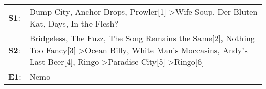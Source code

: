 \begin{supertabular}{p{0.03\textwidth}p{0.92\textwidth}}
 \textbf{S1}:  &                                                                                                                                                                                         Dump City\textsuperscript{}, \enspace Anchor Drops\textsuperscript{}, \enspace Prowler[1]\textsuperscript{} \textgreater \enspace Wife Soup\textsuperscript{}, \enspace Der Bluten Kat\textsuperscript{},  Days\textsuperscript{}, \enspace In the Flesh?\textsuperscript{}  \enspace  \\
 \textbf{S2}:  &  Bridgeless\textsuperscript{}, \enspace The Fuzz\textsuperscript{}, \enspace The Song Remains the Same[2]\textsuperscript{}, \enspace Nothing Too Fancy[3]\textsuperscript{} \textgreater \enspace Ocean Billy\textsuperscript{}, \enspace White Man's Moccasins\textsuperscript{}, \enspace Andy's Last Beer[4]\textsuperscript{}, \enspace Ringo\textsuperscript{} \textgreater \enspace Paradise City[5]\textsuperscript{} \textgreater \enspace Ringo[6]\textsuperscript{}  \enspace  \\
 \textbf{E1}:  &                                                                                                                                                                                                                                                                                                                                                                                                                                                         Nemo\textsuperscript{}  \enspace  \\
\end{supertabular}
